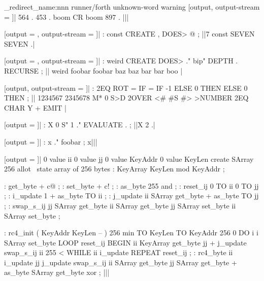 {
  \ExplSyntaxOn
  \msg_redirect_name:nnn { runner/forth } { unknown-word } { warning }
  [output, output-stream = \z@]|
    564 . 453 . boom CR boom 897 .
  |||
}

[output = \result, output-stream = \z@]|
  : const CREATE , DOES> @ ;
||7 const SEVEN SEVEN .|
\typeout{\result}

[output = \result, output-stream = \z@]|
  : weird CREATE DOES> ." bip" DEPTH . RECURSE ;
||
  weird foobar foobar baz baz bar bar boo
|
\typeout{\result}

[output, output-stream = \z@]|
  : 2EQ ROT = IF = IF -1 ELSE 0 THEN ELSE 0 THEN ;
||
  1234567 2345678 M*
  0 S>D
  2OVER <# #S #> >NUMBER
  2EQ CHAR Y + EMIT
|

[output = \result]|
  : X 0 S" 1 ." EVALUATE . ;
||X 2 .|
\typeout{\result}

[output = \result]|
  : x ." foobar
  ; x|||
\typeout{\result}

\stop

[output = \result]|
  0 value ii        0 value jj
  0 value KeyAddr   0 value KeyLen
  create SArray   256 allot   \ state array of 256 bytes
  : KeyArray      KeyLen mod   KeyAddr ;

  : get_byte      + c@ ;
  : set_byte      + c! ;
  : as_byte       255 and ;
  : reset_ij      0 TO ii   0 TO jj ;
  : i_update      1 +   as_byte TO ii ;
  : j_update      ii SArray get_byte +   as_byte TO jj ;
  : swap_s_ij
      jj SArray get_byte
         ii SArray get_byte  jj SArray set_byte
      ii SArray set_byte
  ;

  : rc4_init ( KeyAddr KeyLen -- )
      256 min TO KeyLen   TO KeyAddr
      256 0 DO   i i SArray set_byte   LOOP
      reset_ij
      BEGIN
          ii KeyArray get_byte   jj +  j_update
          swap_s_ij
          ii 255 < WHILE
          ii i_update
      REPEAT
      reset_ij
  ;
  : rc4_byte
      ii i_update   jj j_update
      swap_s_ij
      ii SArray get_byte   jj SArray get_byte +   as_byte SArray get_byte  xor
  ;
|||
\typeout{\result}

\stop
